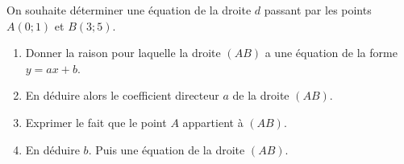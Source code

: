 
On souhaite déterminer une équation de la droite $d$ passant par les points $A(0;1)$ et $B(3;5)$.
\begin{enumerate}
\item Donner la raison pour laquelle la droite $(AB)$ a une équation de la forme $y=ax+b$.
\item  En déduire alors le coefficient directeur $a$ de la droite $(AB)$.
\item  Exprimer le fait que le point $A$ appartient à $(AB)$.
\item  En déduire $b$. Puis une équation de la droite $(AB)$.\end{enumerate}

